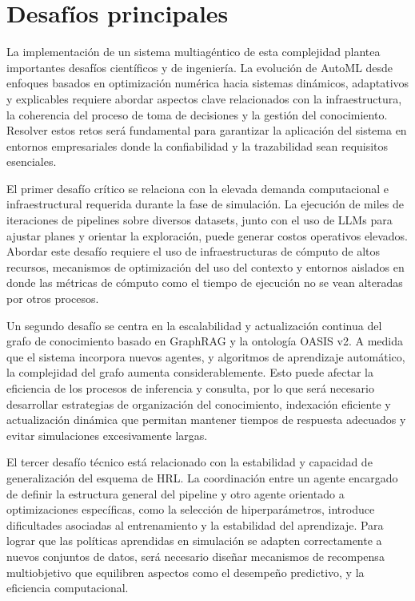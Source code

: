 \documentclass[conference]{IEEEtran}
\begin{document}
\section{Desafíos principales}

La implementación de un sistema multiagéntico de esta complejidad plantea importantes desafíos científicos y de ingeniería. La evolución de AutoML desde enfoques basados en optimización numérica hacia sistemas dinámicos, adaptativos y explicables requiere abordar aspectos clave relacionados con la infraestructura, la coherencia del proceso de toma de decisiones y la gestión del conocimiento. Resolver estos retos será fundamental para garantizar la aplicación del sistema en entornos empresariales donde la confiabilidad y la trazabilidad sean requisitos esenciales.

El primer desafío crítico se relaciona con la elevada demanda computacional e infraestructural requerida durante la fase de simulación. La ejecución de miles de iteraciones de pipelines sobre diversos datasets, junto con el uso de LLMs para ajustar planes y orientar la exploración, puede generar costos operativos elevados. Abordar este desafío requiere el uso de infraestructuras de cómputo de altos recursos, mecanismos de optimización del uso del contexto y entornos aislados en donde las métricas de cómputo como el tiempo de ejecución no se vean alteradas por otros procesos.

Un segundo desafío se centra en la escalabilidad y actualización continua del grafo de conocimiento basado en GraphRAG y la ontología OASIS v2. A medida que el sistema incorpora nuevos agentes, y algoritmos de aprendizaje automático, la complejidad del grafo aumenta considerablemente. Esto puede afectar la eficiencia de los procesos de inferencia y consulta, por lo que será necesario desarrollar estrategias de organización del conocimiento, indexación eficiente y actualización dinámica que permitan mantener tiempos de respuesta adecuados y evitar simulaciones excesivamente largas.


El tercer desafío técnico está relacionado con la estabilidad y capacidad de generalización del esquema de HRL. La coordinación entre un agente encargado de definir la estructura general del pipeline y otro agente orientado a optimizaciones específicas, como la selección de hiperparámetros, introduce dificultades asociadas al entrenamiento y la estabilidad del aprendizaje. Para lograr que las políticas aprendidas en simulación se adapten correctamente a nuevos conjuntos de datos, será necesario diseñar mecanismos de recompensa multiobjetivo que equilibren aspectos como el desempeño predictivo, y la eficiencia computacional.
\end{document}
